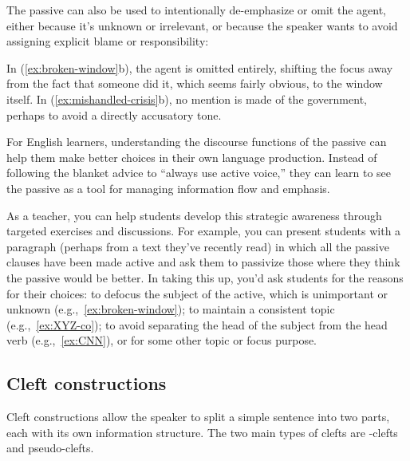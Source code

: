The passive can also be used to intentionally de-emphasize or omit the agent, either because it's unknown or irrelevant, or because the speaker wants to avoid assigning explicit blame or responsibility:

\ea\label{ex:broken-window}
    \z
\ex\label{ex:mishandled-crisis}
    \z
\z
In (\ref{ex:broken-window}b), the agent is omitted entirely, shifting the focus away from the fact that someone did it, which seems fairly obvious, to the window itself. In (\ref{ex:mishandled-crisis}b), no mention is made of the government, perhaps to avoid a directly accusatory tone.

For English learners, understanding the discourse functions of the passive can help them make better choices in their own language production. Instead of following the blanket advice to \enquote{always use active voice,} they can learn to see the passive as a tool for managing information flow and emphasis.

As a teacher, you can help students develop this strategic awareness through targeted exercises and discussions. For example, you can present students with a paragraph (perhaps from a text they've recently read) in which all the passive clauses have been made active and ask them to passivize those where they think the passive would be better. In taking this up, you'd ask students for the reasons for their choices: to defocus the subject of the active, which is unimportant or unknown (e.g.,~\ref{ex:broken-window}); to maintain a consistent topic (e.g.,~\ref{ex:XYZ-co}); to avoid separating the head of the subject from the head verb (e.g.,~\ref{ex:CNN}), or for some other topic or focus purpose.

\subsection{Cleft constructions} \label{sec:clefts}

Cleft constructions allow the speaker to split a simple sentence into two parts, each with its own information structure. The two main types of clefts are -clefts and pseudo-clefts.

